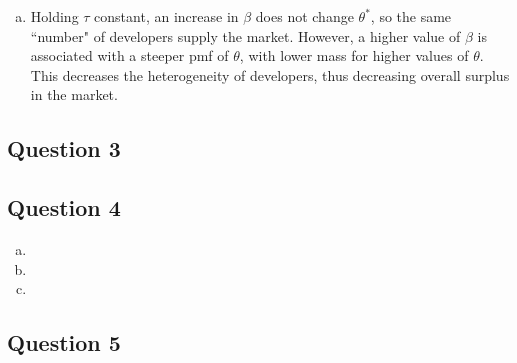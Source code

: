 \documentclass{article}
\begin{document}
\begin{enumerate}[(a)]
	\item Holding $\tau$ constant, an increase in $\beta$ does not change $\theta^*$, so the same ``number" of developers supply the market. However, a higher value of $\beta$ is associated with a steeper pmf of $\theta$, with lower mass for higher values of $\theta$. This decreases the heterogeneity of developers, thus decreasing overall surplus in the market.
	
\end{enumerate}


\subsection*{Question 3}





\subsection*{Question 4}

\begin{enumerate}[(a)]
	\item 
	
	\item 
	
	\item 
	
\end{enumerate}




\subsection*{Question 5}




\end{document}
